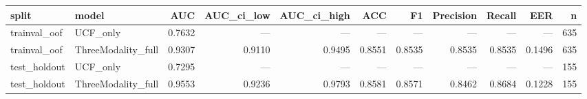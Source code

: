 \begin{tabular}{llrrrrrrrrr}
\toprule
split & model & AUC & AUC_ci_low & AUC_ci_high & ACC & F1 & Precision & Recall & EER & n \\
\midrule
trainval_oof & UCF_only & 0.7632 & — & — & — & — & — & — & — & 635 \\
trainval_oof & ThreeModality_full & 0.9307 & 0.9110 & 0.9495 & 0.8551 & 0.8535 & 0.8535 & 0.8535 & 0.1496 & 635 \\
test_holdout & UCF_only & 0.7295 & — & — & — & — & — & — & — & 155 \\
test_holdout & ThreeModality_full & 0.9553 & 0.9236 & 0.9793 & 0.8581 & 0.8571 & 0.8462 & 0.8684 & 0.1228 & 155 \\
\bottomrule
\end{tabular}
